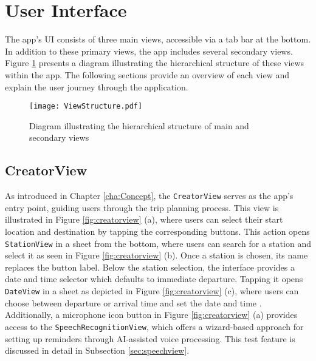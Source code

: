 \section{User Interface}
The app's \ac{UI} consists of three main views, accessible via a tab bar at the bottom.
In addition to these primary views, the app includes several secondary views.
Figure \ref{fig:viewstructure} presents a diagram illustrating the hierarchical structure of these views within the app. 
The following sections provide an overview of each view and explain the user journey through the application.

\begin{figure}[htbp]
    \centering
    \texttt{[image: ViewStructure.pdf]}
    \caption{Diagram illustrating the hierarchical structure of main and secondary views}
    \label{fig:viewstructure}
\end{figure}

\subsection{CreatorView}
As introduced in Chapter \ref{cha:Concept}, the \lstinline{CreatorView} serves as the app's entry point, guiding users through the trip planning process. 
This view is illustrated in Figure \ref{fig:creatorview} (a), where users can select their start location  and destination  by tapping the corresponding buttons.
This action opens \lstinline{StationView} in a sheet from the bottom, where users can search for a station and select it as seen in Figure \ref{fig:creatorview} (b). 
Once a station is chosen, its name replaces the button label.
Below the station selection, the interface provides a date and time selector  which defaults to immediate departure. 
Tapping it opens \lstinline{DateView} in a sheet as depicted in Figure \ref{fig:creatorview} (c), where users can choose between departure or arrival time  and set the date  and time .
Additionally, a microphone icon button  in Figure \ref{fig:creatorview} (a) provides access to the \lstinline{SpeechRecognitionView}, which offers a wizard-based approach for setting up reminders through AI-assisted voice processing. 
This test feature is discussed in detail in Subsection \ref{sec:speechview}.

